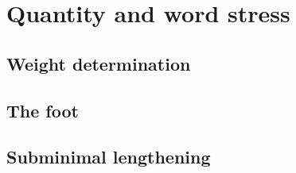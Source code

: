 \chapter{Quantity and word stress}

\section{Weight determination}

\section{The foot}

\section{Subminimal lengthening}
